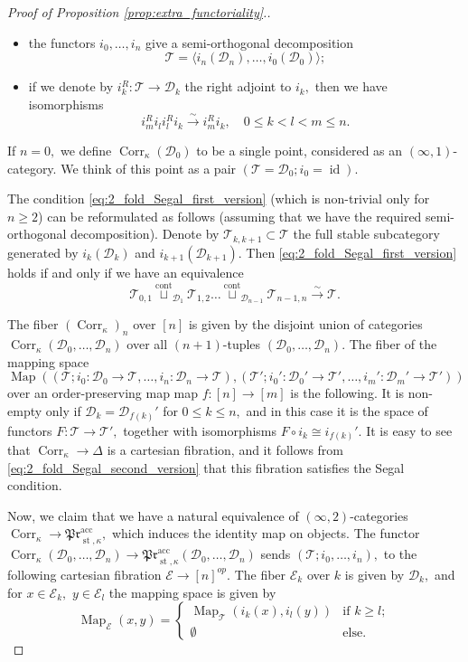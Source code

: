 \documentclass[11pt,leqno]{amsart}
\numberwithin{equation}{section}
\def\Map{\operatorname{Map}}
\newcommand{\xto}{\xrightarrow}
\newcommand{\Corr}{\operatorname{Corr}}
\newcommand{\cont}{\operatorname{cont}}
\newcommand{\acc}{\operatorname{acc}}
\newcommand{\st}{\operatorname{st}}
\newcommand{\cD}{{\mathcal D}}
\newcommand{\cE}{{\mathcal E}}
\newcommand{\cT}{{\mathcal T}}
\newcommand{\id}{\operatorname{id}}
\newcommand{\mPr}{\mathfrak{Pr}}
\begin{document}
\begin{proof}[Proof of Proposition \ref{prop:extra_functoriality}.]
\begin{itemize}
\item the functors $i_0,\dots,i_n$ give a semi-orthogonal decomposition
$$\cT=\langle i_n(\cD_n),\dots,i_0(\cD_0)\rangle;$$

\item if we denote by $i_k^R:\cT\to\cD_k$ the right adjoint to $i_k,$ then we have isomorphisms
\begin{equation}\label{eq:2_fold_Segal_first_version}
i_m^R i_l i_l^R i_k\xto{\sim}i_m^R i_k,\quad 0\leq k<l<m\leq n.
\end{equation} 
\end{itemize}

If $n=0,$ we define $\Corr_{\kappa}(\cD_0)$ to be a single point, considered as an $(\infty,1)$-category. We think of this point as a pair $(\cT=\cD_0;i_0=\id).$

The condition \eqref{eq:2_fold_Segal_first_version} (which is non-trivial only for $n\geq 2$) can be reformulated as follows (assuming that we have the required semi-orthogonal decomposition). Denote by $\cT_{k,k+1}\subset \cT$ the full stable subcategory generated by $i_k(\cD_k)$ and $i_{k+1}(\cD_{k+1}).$ Then \eqref{eq:2_fold_Segal_first_version} holds if and only if we have an equivalence
\begin{equation}\label{eq:2_fold_Segal_second_version}\cT_{0,1}\stackrel{\cont}{\sqcup}_{\cD_1}\cT_{1,2}\dots\stackrel{\cont}{\sqcup}_{\cD_{n-1}}\cT_{n-1,n}\xto{\sim}\cT.\end{equation}


The fiber $(\Corr_{\kappa})_n$ over $[n]$ is given by the disjoint union of categories $\Corr_{\kappa}(\cD_0,\dots,\cD_n)$ over all $(n+1)$-tuples $(\cD_0,\dots,\cD_n).$ The fiber of the mapping space $$\Map((\cT;i_0:\cD_0\to \cT,\dots,i_n:\cD_n\to\cT),(\cT';i_0':\cD_0'\to \cT',\dots,i_m':\cD_m'\to\cT'))$$
over an order-preserving map map $f:[n]\to [m]$ is the following. It is non-empty only if $\cD_k=\cD_{f(k)}'$ for $0\leq k\leq n,$ and in this case it is the space of functors $F:\cT\to\cT',$ together with isomorphisms $F\circ i_k\cong i_{f(k)}'.$ It is easy to see that $\Corr_{\kappa}\to\Delta$ is a cartesian fibration, and it follows from \eqref{eq:2_fold_Segal_second_version} that this fibration satisfies the Segal condition.

Now, we claim that we have a natural equivalence of $(\infty,2)$-categories $\Corr_{\kappa}\to \mPr^{\acc}_{\st,\kappa},$ which induces the identity map on objects. The functor $\Corr_{\kappa}(\cD_0,\dots,\cD_n)\to \mPr^{\acc}_{\st,\kappa}(\cD_0,\dots,\cD_n)$ sends $(\cT;i_0,\dots,i_n),$ to the following cartesian fibration $\cE\to [n]^{op}.$ The fiber $\cE_k$ over $k$ is given by $\cD_k,$ and for $x\in\cE_k,$ $y\in\cE_l$ the mapping space is given by
$$\Map_{\cE}(x,y)=\begin{cases}\Map_{\cT}(i_k(x),i_l(y)) & \text{if }k\geq l;\\
\emptyset & \text{else.}\end{cases}$$


\end{proof}
\end{document}
